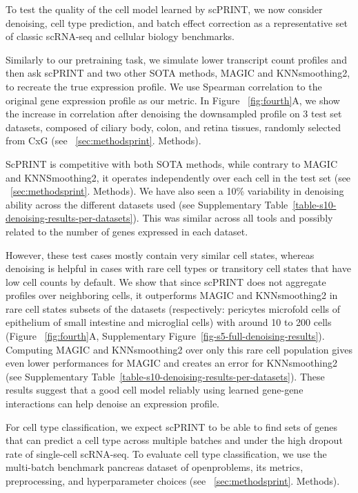 To test the quality of the cell model learned by \gls{scPRINT}, we now consider denoising, cell type prediction, and batch effect correction as a representative set of classic \gls{scRNA-seq} and cellular biology benchmarks.

Similarly to our pretraining task, we simulate lower transcript count profiles and then ask \gls{scPRINT} and two other \gls{SOTA} methods, MAGIC\citep{dijkRecoveringGeneInteractions2018} and KNNsmoothing2\citep{wagnerKnearestNeighborSmoothing2018}, to recreate the true expression profile. We use Spearman correlation to the original gene expression profile as our metric. In Figure ~\ref{fig:fourth}A, we show the increase in correlation after denoising the downsampled profile on 3 test set datasets, composed of ciliary body, colon, and retina tissues\citep{wangSinglecellMultiomeHuman2022b,vanzylCellAtlasHuman2022,burclaffProximaltoDistalSurveyHealthy2022}, randomly selected from \gls{CxG} (see ~\ref{sec:methodsprint}. Methods). 

ScPRINT is competitive with both \gls{SOTA} methods, while contrary to MAGIC and KNNSmoothing2, it operates independently over each cell in the test set (see ~\ref{sec:methodsprint}. Methods). We have also seen a 10\% variability in denoising ability across the different datasets used (see Supplementary Table~\ref{table-s10-denoising-results-per-datasets}). This was similar across all tools and possibly related to the number of genes expressed in each dataset.

However, these test cases mostly contain very similar cell states, whereas denoising is helpful in cases with rare cell types or transitory cell states that have low cell counts by default. We show that since \gls{scPRINT} does not aggregate profiles over neighboring cells, it outperforms MAGIC and KNNsmoothing2 in rare cell states subsets of the datasets (respectively: pericytes microfold cells of epithelium of small intestine and microglial cells) with around 10 to 200 cells (Figure ~\ref{fig:fourth}A, Supplementary Figure~\ref{fig-s5-full-denoising-results}). Computing MAGIC and KNNsmoothing2 over only this rare cell population gives even lower performances for MAGIC and creates an error for KNNsmoothing2 (see Supplementary Table~\ref{table-s10-denoising-results-per-datasets}). These results suggest that a good cell model reliably using learned gene-gene interactions can help denoise an expression profile.

For cell type classification, we expect \gls{scPRINT} to be able to find sets of genes that can predict a cell type across multiple batches and under the high dropout rate of single-cell \gls{scRNA-seq}. To evaluate cell type classification, we use the multi-batch benchmark pancreas dataset of openproblems, its metrics, preprocessing, and hyperparameter choices (see ~\ref{sec:methodsprint}. Methods)\citep{lueckenBenchmarkingAtlaslevelData2022,OpenproblemsbioOpenproblemsv22024}.

